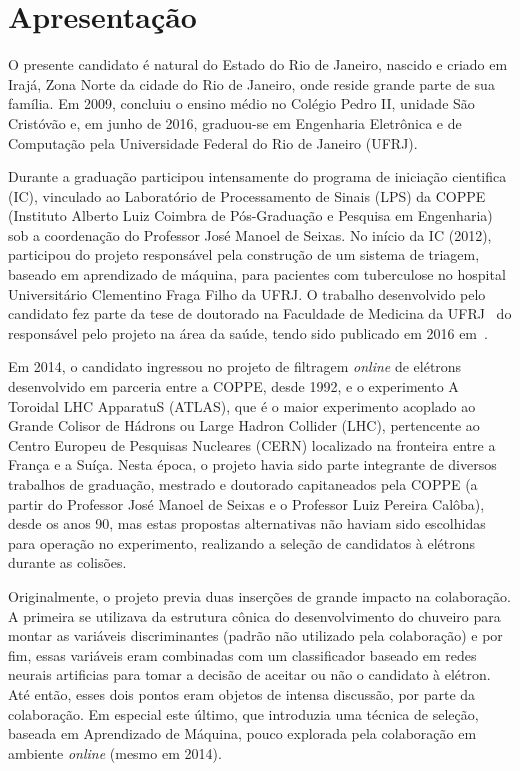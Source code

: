 


\section{Apresentação}\label{sec:apresentation}

O presente candidato é natural do Estado do Rio de Janeiro, nascido 
e criado em Irajá, Zona Norte da cidade do Rio de Janeiro, onde 
reside grande parte de sua família. Em 2009, concluiu o ensino médio no 
Colégio Pedro II, unidade São Cristóvão e, em junho de 2016, graduou-se em Engenharia 
Eletrônica e de Computação pela Universidade Federal do Rio de Janeiro (UFRJ).



Durante a graduação participou intensamente do programa de iniciação 
cientifica (IC), vinculado ao Laboratório de Processamento de Sinais (LPS) da 
COPPE (Instituto Alberto Luiz Coimbra de Pós-Graduação e Pesquisa em Engenharia) 
sob a coordenação do Professor José Manoel de Seixas. No início da IC (2012), participou 
do projeto responsável pela construção de um sistema de triagem, baseado em aprendizado de 
máquina, para pacientes com tuberculose no hospital Universitário Clementino Fraga Filho da UFRJ. 
O trabalho desenvolvido pelo candidato fez parte da tese de doutorado na Faculdade
de Medicina da UFRJ~\cite{tese_fabio_aguiar} do responsável pelo projeto na área da saúde, 
tendo sido publicado em 2016 em~\cite{paper_tb_som}. 

Em 2014, o candidato ingressou no projeto de filtragem \emph{online} de elétrons 
desenvolvido em parceria entre a COPPE, desde 1992, e o experimento A Toroidal LHC 
ApparatuS (ATLAS), que é o maior experimento acoplado ao Grande Colisor de Hádrons ou 
Large Hadron Collider (LHC), pertencente ao Centro Europeu de Pesquisas Nucleares (CERN) 
localizado na fronteira entre a França e a Suíça. Nesta época, o projeto havia sido parte 
integrante de diversos trabalhos de graduação, mestrado e doutorado capitaneados pela 
COPPE (a partir do Professor José Manoel de Seixas e o Professor Luiz Pereira Calôba), desde 
os anos 90, mas estas propostas alternativas não haviam sido escolhidas para operação no 
experimento, realizando a seleção de candidatos à elétrons durante as colisões. 



Originalmente, o projeto previa duas inserções de grande impacto na colaboração. 
A primeira se utilizava da estrutura cônica do desenvolvimento do chuveiro para montar 
as variáveis discriminantes (padrão não utilizado pela colaboração) e por fim, essas 
variáveis eram combinadas com um classificador baseado em redes neurais artificias para 
tomar a decisão de aceitar ou não o candidato à elétron. Até então, esses dois pontos eram 
objetos de intensa discussão, por parte da colaboração. Em especial este último, que 
introduzia uma técnica de seleção, baseada em Aprendizado de Máquina, pouco explorada pela 
colaboração em ambiente \emph{online} (mesmo em 2014). 



